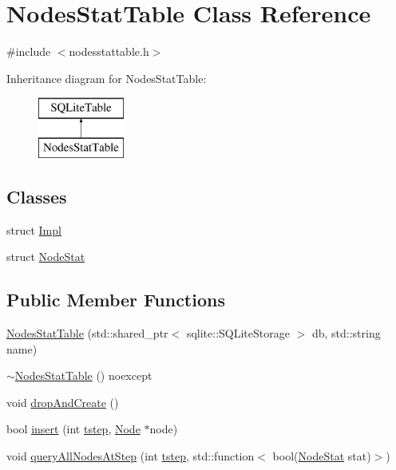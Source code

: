\hypertarget{class_nodes_stat_table}{}\section{Nodes\+Stat\+Table Class Reference}
\label{class_nodes_stat_table}


{\ttfamily \#include $<$nodesstattable.\+h$>$}

Inheritance diagram for Nodes\+Stat\+Table\+:\begin{figure}[H]
\begin{center}
\leavevmode
\includegraphics[height=2.000000cm]{df/d04/class_nodes_stat_table}
\end{center}
\end{figure}
\subsection*{Classes}
\begin{DoxyCompactItemize}
\item 
struct \mbox{\hyperlink{struct_nodes_stat_table_1_1_impl}{Impl}}
\item 
struct \mbox{\hyperlink{struct_nodes_stat_table_1_1_node_stat}{Node\+Stat}}
\end{DoxyCompactItemize}
\subsection*{Public Member Functions}
\begin{DoxyCompactItemize}
\item 
\mbox{\hyperlink{class_nodes_stat_table_a0634098ee5044cb1c45ee9f98ceda634}{Nodes\+Stat\+Table}} (std\+::shared\+\_\+ptr$<$ sqlite\+::\+S\+Q\+Lite\+Storage $>$ db, std\+::string name)
\item 
\mbox{\hyperlink{class_nodes_stat_table_a760231eb30d44edb19df78f1744c38dd}{$\sim$\+Nodes\+Stat\+Table}} () noexcept
\item 
void \mbox{\hyperlink{class_nodes_stat_table_a867eaa1657a7125132dda8bdea8c0eae}{drop\+And\+Create}} ()
\item 
bool \mbox{\hyperlink{class_nodes_stat_table_a0799bc8fb3e753ed845f416065a81b6f}{insert}} (int \mbox{\hyperlink{thread__vessels_8cpp_a84bc73d278de929ec9974e1a95d9b23a}{tstep}}, \mbox{\hyperlink{class_node}{Node}} $\ast$node)
\item 
void \mbox{\hyperlink{class_nodes_stat_table_a4af2ed624c3dcaaebd5ff55c735ade9e}{query\+All\+Nodes\+At\+Step}} (int \mbox{\hyperlink{thread__vessels_8cpp_a84bc73d278de929ec9974e1a95d9b23a}{tstep}}, std\+::function$<$ bool(\mbox{\hyperlink{struct_nodes_stat_table_1_1_node_stat}{Node\+Stat}} stat)$>$)
\end{DoxyCompactItemize}


